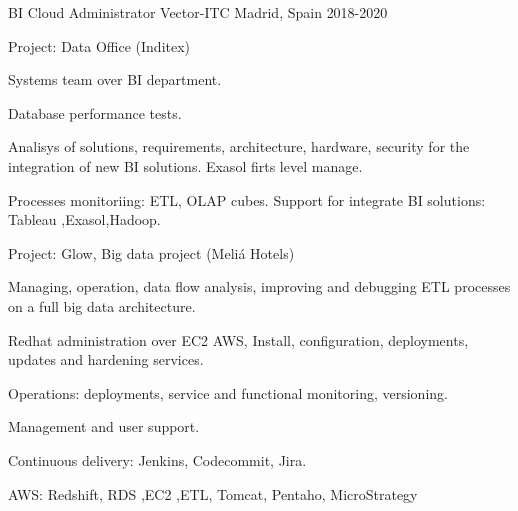 \begin{cventries}
  \cventry
    {BI Cloud Administrator} %
    {Vector-ITC} %
    {Madrid, Spain} %
    {2018-2020} %
    {
      \begin{cvitems} %
        \item {Project: Data Office (Inditex)}
        \item {Systems team over BI department.}
        \item {Database performance tests.}
        \item {Analisys of solutions, requirements, architecture, hardware, security for the integration of new BI solutions. Exasol firts level manage.}
        \item {Processes monitoriing: ETL, OLAP cubes. Support for integrate BI solutions: Tableau ,Exasol,Hadoop.}
        \item {Project: Glow, Big data project (Meliá Hotels)}
        \item {Managing, operation, data flow analysis, improving and debugging ETL processes on a full big data architecture.}
        \item {Redhat administration over EC2 AWS, Install, configuration, deployments, updates and hardening  services.}
        \item {Operations: deployments, service and functional monitoring, versioning.}
        \item {Management and user support.}
        \item {Continuous delivery: Jenkins, Codecommit, Jira.}
        \item {AWS: Redshift, RDS ,EC2 ,ETL, Tomcat, Pentaho, MicroStrategy}
      \end{cvitems}
    }


\end{cventries}

